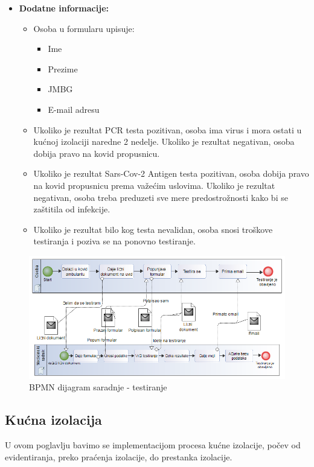 \documentclass[titlepage]{article}
\begin{document}
\begin{itemize}
\begin{itemize}
        \end{itemize}
    \item \textbf{Dodatne informacije:}
        \begin{itemize}
            \item Osoba u formularu upisuje:
            \begin{itemize}
                \item Ime
                \item Prezime
                \item JMBG
                \item E-mail adresu
            \end{itemize}
            \item Ukoliko je rezultat PCR testa pozitivan, osoba ima virus i mora ostati u kućnoj izolaciji naredne 2 nedelje. Ukoliko je rezultat negativan, osoba dobija pravo na kovid propusnicu.
            \item Ukoliko je rezultat Sars-Cov-2 Antigen testa pozitivan, osoba dobija pravo na kovid propusnicu prema važećim uslovima. Ukoliko je rezultat negativan, osoba treba preduzeti sve mere predostrožnosti kako bi se zaštitila od infekcije.
            \item Ukoliko je rezultat bilo kog testa nevalidan, osoba snosi troškove testiranja i poziva se na ponovno testiranje.
        \end{itemize}
\end{itemize}

\begin{figure}[H]
\centering
\includegraphics[scale=0.5]{Dijagram_testiranje}
\caption{BPMN dijagram saradnje - testiranje}
\end{figure}

\subsection{Kućna izolacija}
U ovom poglavlju bavimo se implementacijom procesa kućne izolacije, počev od evidentiranja, preko praćenja izolacije, do prestanka izolacije.
\end{document}
